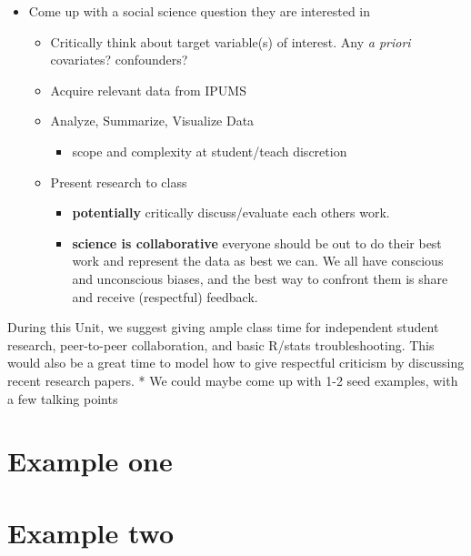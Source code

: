 \documentclass[
]{book}
\providecommand{\tightlist}{%
  \setlength{\itemsep}{0pt}\setlength{\parskip}{0pt}}
\begin{document}
\begin{itemize}
\tightlist
\item
  Come up with a social science question they are interested in

  \begin{itemize}
  \tightlist
  \item
    Critically think about target variable(s) of interest. Any \emph{a priori} covariates? confounders?
  \item
    Acquire relevant data from IPUMS
  \item
    Analyze, Summarize, Visualize Data

    \begin{itemize}
    \tightlist
    \item
      scope and complexity at student/teach discretion
    \end{itemize}
  \item
    Present research to class

    \begin{itemize}
    \tightlist
    \item
      \textbf{potentially} critically discuss/evaluate each others work.
    \item
      \textbf{science is collaborative} everyone should be out to do their best work and represent the data as best we can. We all have conscious and unconscious biases, and the best way to confront them is share and receive (respectful) feedback.
    \end{itemize}
  \end{itemize}
\end{itemize}

During this Unit, we suggest giving ample class time for independent student research, peer-to-peer collaboration, and basic R/stats troubleshooting. This would also be a great time to model how to give respectful criticism by discussing recent research papers.
* We could maybe come up with 1-2 seed examples, with a few talking points

\hypertarget{example-one}{%
\section{Example one}\label{example-one}}

\hypertarget{example-two}{%
\section{Example two}\label{example-two}}
\end{document}
